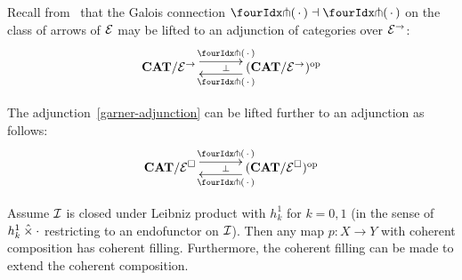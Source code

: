 \documentclass[reqno,10pt,a4paper,oneside]{amsart}
\begin{document}
Recall from~\cite{garner:small-object-argument} that the Galois connection $\liftl{\brarghole} \dashv \liftr{\brarghole}$ on the class of arrows of $\catE$ may be lifted to an adjunction of categories over $\catE^{\to}$:
\begin{equation}
\label{garner-adjunction}
\begin{gathered}
\xymatrix@C+1em{
  \CAT/\catE^{\to}
  \ar@<5pt>[r]^{\liftl{\brarghole}}
  \ar@{}[r]|{\bot}
&
  (\CAT/\catE^{\to})^{\op}
  \ar@<5pt>[l]^{\liftr{\brarghole}}
}
\end{gathered}
\end{equation}

\begin{lemma}
 \label{garner-adjunction-extended}
The adjunction~\eqref{garner-adjunction} can be lifted further to an adjunction as follows:
\begin{equation}
\label{garner-adjunction-extended}
\begin{gathered}
\xymatrix@C+1em{
  \CAT/\catE^{\Box}
  \ar@<5pt>[r]^{\liftl{\brarghole}}
  \ar@{}[r]|{\bot}
&
  (\CAT/\catE^{\Box})^{\op}
  \ar@<5pt>[l]^{\liftr{\brarghole}}
}
\end{gathered}
\end{equation}
\end{lemma}

\begin{theorem}
Assume $\cal{I}$ is closed under Leibniz product with $h_k^1$ for $k = 0, 1$ (in the sense of $h_k^1 \hattimes \arghole$ restricting to an endofunctor on $\cal{I}$).
Then any map $p : X \to Y$ with coherent composition has coherent filling.
Furthermore, the coherent filling can be made to extend the coherent composition.
\end{theorem}
\end{document}

